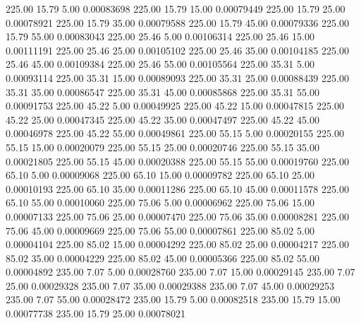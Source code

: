     225.00     15.79      5.00     0.00083698
    225.00     15.79     15.00     0.00079449
    225.00     15.79     25.00     0.00078921
    225.00     15.79     35.00     0.00079588
    225.00     15.79     45.00     0.00079336
    225.00     15.79     55.00     0.00083043
    225.00     25.46      5.00     0.00106314
    225.00     25.46     15.00     0.00111191
    225.00     25.46     25.00     0.00105102
    225.00     25.46     35.00     0.00104185
    225.00     25.46     45.00     0.00109384
    225.00     25.46     55.00     0.00105564
    225.00     35.31      5.00     0.00093114
    225.00     35.31     15.00     0.00089093
    225.00     35.31     25.00     0.00088439
    225.00     35.31     35.00     0.00086547
    225.00     35.31     45.00     0.00085868
    225.00     35.31     55.00     0.00091753
    225.00     45.22      5.00     0.00049925
    225.00     45.22     15.00     0.00047815
    225.00     45.22     25.00     0.00047345
    225.00     45.22     35.00     0.00047497
    225.00     45.22     45.00     0.00046978
    225.00     45.22     55.00     0.00049861
    225.00     55.15      5.00     0.00020155
    225.00     55.15     15.00     0.00020079
    225.00     55.15     25.00     0.00020746
    225.00     55.15     35.00     0.00021805
    225.00     55.15     45.00     0.00020388
    225.00     55.15     55.00     0.00019760
    225.00     65.10      5.00     0.00009068
    225.00     65.10     15.00     0.00009782
    225.00     65.10     25.00     0.00010193
    225.00     65.10     35.00     0.00011286
    225.00     65.10     45.00     0.00011578
    225.00     65.10     55.00     0.00010060
    225.00     75.06      5.00     0.00006962
    225.00     75.06     15.00     0.00007133
    225.00     75.06     25.00     0.00007470
    225.00     75.06     35.00     0.00008281
    225.00     75.06     45.00     0.00009669
    225.00     75.06     55.00     0.00007861
    225.00     85.02      5.00     0.00004104
    225.00     85.02     15.00     0.00004292
    225.00     85.02     25.00     0.00004217
    225.00     85.02     35.00     0.00004229
    225.00     85.02     45.00     0.00005366
    225.00     85.02     55.00     0.00004892
    235.00      7.07      5.00     0.00028760
    235.00      7.07     15.00     0.00029145
    235.00      7.07     25.00     0.00029328
    235.00      7.07     35.00     0.00029388
    235.00      7.07     45.00     0.00029253
    235.00      7.07     55.00     0.00028472
    235.00     15.79      5.00     0.00082518
    235.00     15.79     15.00     0.00077738
    235.00     15.79     25.00     0.00078021

